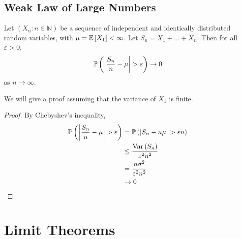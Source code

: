 \documentclass{article}
\begin{document}
\subsection{Weak Law of Large Numbers}
\begin{theorem}
	Let $(X_n \colon n \in \mathbb N)$ be a sequence of independent and identically distributed random variables, with $\mu = \mathbb{E}\left[{X_1}\right] < \infty$. Let $S_n = X_1 + \dots + X_n$. Then for all $\varepsilon > 0$,
	\[ \mathbb{P}\left({\abs{\frac{S_n}{n} - \mu} > \varepsilon}\right) \to 0 \]
	as $n \to \infty$.
\end{theorem}
\noindent We will give a proof assuming that the variance of $X_1$ is finite.
\begin{proof}
	By Chebyshev's inequality,
	\begin{align*}
		\mathbb{P}\left({\abs{\frac{S_n}{n} - \mu} > \varepsilon}\right) & = \mathbb{P}\left({\abs{S_n - n\mu} > \varepsilon n}\right) \\
		                                               & \leq \frac{\operatorname{Var}\left({S_n}\right)}{\varepsilon^2 n^2}  \\
		                                               & = \frac{n\sigma^2}{\varepsilon^2 n^2}     \\
		                                               & \to 0
	\end{align*}
\end{proof}

\section{Limit Theorems}
\end{document}
